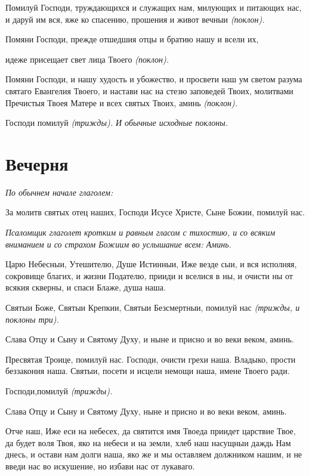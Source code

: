    Помилуй Господи, труждающихся и служащих нам, милующих и
питающих нас, и даруй им вся, яже ко спасению, прошения и живот вечныи
\itshape (поклон)\normalfont{}.


   Помяни Господи, прежде отшедшия отцы и братию нашу и всели их,

идеже присещает свет лица Твоего \itshape (поклон)\normalfont{}.


   Помяни Господи, и нашу худость и убожество, и просвети наш ум светом
разума святаго Евангелия Твоего, и настави нас на стезю заповедей Твоих,
молитвами Пречистыя Твоея Матере и всех святых Твоих, аминь
\itshape (поклон)\normalfont{}.


   Господи помилуй \itshape (трижды). И обычные исходные поклоны.\normalfont{}



\section{Вечерня}



\itshape По обычнем начале глаголем:\normalfont{}


   За молитв святых отец наших, Господи Исусе Христе, Сыне Божии,
помилуй нас.


 \itshape Псаломщик глаголет кротким и равным гласом с тихостию, и со всяким
вниманием и со страхом Божиим во услышание всем:\normalfont{} Аминь.


   Царю Небесныи, Утешителю, Душе Истинныи, Иже везде сыи,
и вся исполняя, сокровище благих, и жизни Подателю, прииди и
вселися в ны, и очисти ны от всякия скверны, и спаси Блаже, душа
наша.


   Святыи Боже, Святыи Крепкии, Святыи Безсмертныи, помилуй нас
\itshape (трижды, и поклоны три)\normalfont{}.


   Слава Отцу и Сыну и Святому Духу, и ныне и присно и во веки веком,
аминь.


   Пресвятая Троице, помилуй нас. Господи, очисти грехи наша. Владыко,
прости беззакония наша. Святыи, посети и исцели немощи наша, имене
Твоего ради.


   Господи,помилуй \itshape (трижды)\normalfont{}.


   Слава Отцу и Сыну и Святому Духу, ныне и присно и во веки веком,
аминь.


   Отче наш, Иже еси на небесех, да святится имя Твоеда приидет царствие
Твое, да будет воля Твоя, яко на небеси и на земли, хлеб наш насущныи
даждь Нам днесь, и остави нам долги наша, яко же и мы оставляем
должником нашим, и не введи нас во искушение, но избави нас от
лукаваго.



